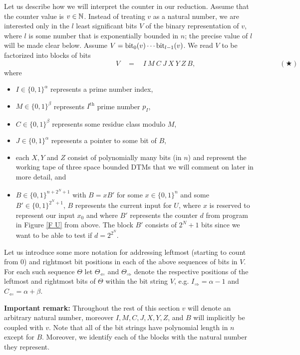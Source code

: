 \documentclass[times,envcountsame]{llncs}
\begin{document}
Let us describe how we will interpret the counter in our reduction.
Assume that the counter value is $v\in\mathbb{N}$.  Instead of
treating $v$ as a natural number, we are interested only in the $l$
least significant bits $V$ of the binary representation of $v$, where $l$
is some number that is exponentially bounded in $n$; the precise value
of $l$ will be made clear below.  Assume
$V=\text{bit}_0(v)\cdots\text{bit}_{l-1}(v)$.  We read $V$ to be factorized into
blocks of bits
$$\qquad\qquad\qquad\qquad\qquad\qquad\qquad\qquad V\quad=\quad I\ M\ C\ J\ X\ Y\ Z\ B,\qquad\qquad\qquad\qquad\qquad\qquad(\bigstar)$$ where
\begin{itemize}
\item $I\in\{0,1\}^{\alpha}$ represents a prime number index,
\item $M\in\{0,1\}^\beta$ represents $I^{\text{th}}$
prime number $p_I$,
\item $C\in\{0,1\}^\beta$ represents some residue class modulo $M$,
\item $J\in\{0,1\}^\alpha$ represents a pointer to some bit of $B$,
\item
each $X,Y$ and $Z$ consist of polynomially many bits (in $n$) and
represent the working tape of three space bounded
DTMs that we will comment on later in more detail, and
\item $B\in\{0,1\}^{n+2^N+1}$ with $B=xB'$ for some
$x\in\{0,1\}^n$ and some
$B'\in\{0,1\}^{2^N+1}$,
$B$ represents the current
input for $U$, where
$x$ is reserved to represent our input $x_0$
and
where $B'$ represents the counter $d$ from program in Figure \ref{F U} from above.
The block $B'$ consists of $2^N+1$ bits since we want to be able to test
 if $d=2^{2^{N}}$.
\end{itemize}


\renewcommand{\Re}{\Rightarrow}
\newcommand{\Li}{\Leftarrow}
\newcommand{\re}{\rightarrow}
\newcommand{\li}{\leftarrow}



\noindent
Let us introduce some more notation for addressing
leftmost (starting to count from $0$) and rightmost bit
positions in each of the above sequences of bits in $V$.
For each such sequence $\Theta$ let $\Theta_{\Li}$ and $\Theta_{\Re}$ denote the
respective positions of the leftmost and rightmost bits of $\Theta$ within the bit
string $V$, e.g. $I_\Re=\alpha-1$ and $C_\Li=\alpha+\beta$.


\medskip

\noindent
{\bf Important remark: } Throughout the rest of this section $v$ will
denote an arbitrary natural number, moreover $I,M,C,J,X,Y,Z$, and $B$
will implicitly be coupled with $v$.  Note that all of the bit strings
have polynomial length in $n$ except for $B$.  Moreover, we identify each
of the blocks with the natural number they represent.
\end{document}

